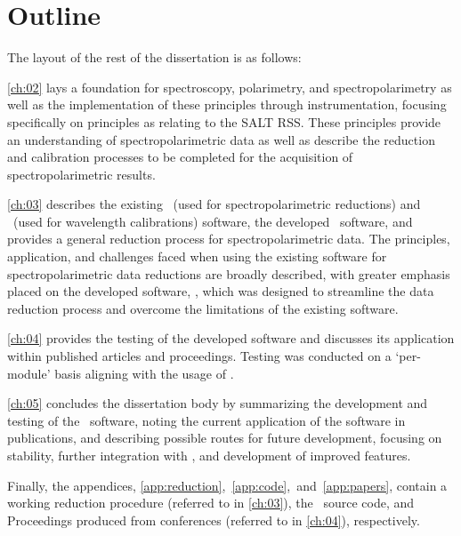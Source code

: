 \section{Outline}

\noindent The layout of the rest of the dissertation is as follows:

\autoref{ch:02} lays a foundation for spectroscopy, polarimetry, and spectropolarimetry as well as the implementation of these principles through instrumentation, focusing specifically on principles as relating to the \gls{SALT} \gls{RSS}.
These principles provide an understanding of spectropolarimetric data as well as describe the reduction and calibration processes to be completed for the acquisition of spectropolarimetric results.

\autoref{ch:03} describes the existing \polsalt\ (used for spectropolarimetric reductions) and \iraf\ (used for wavelength calibrations) software, the developed \stops\ software, and provides a general reduction process for spectropolarimetric data.
The principles, application, and challenges faced when using the existing software for spectropolarimetric data reductions are broadly described, with greater emphasis placed on the developed software, \stops, which was designed to streamline the data reduction process and overcome the limitations of the existing software.

\autoref{ch:04} provides the testing of the developed software and discusses its application within published articles and proceedings.
Testing was conducted on a `per-module' basis aligning with the usage of \stops.

\autoref{ch:05} concludes the dissertation body by summarizing the development and testing of the \stops\ software, noting the current application of the software in publications, and describing possible routes for future development, focusing on stability, further integration with \polsalt, and development of improved features.

Finally, the appendices, \autoref{app:reduction},~\ref{app:code},~and~\ref{app:papers}, contain a working reduction procedure (referred to in \autoref{ch:03}), the \stops\ source code, and Proceedings produced from conferences (referred to in \autoref{ch:04}), respectively.
